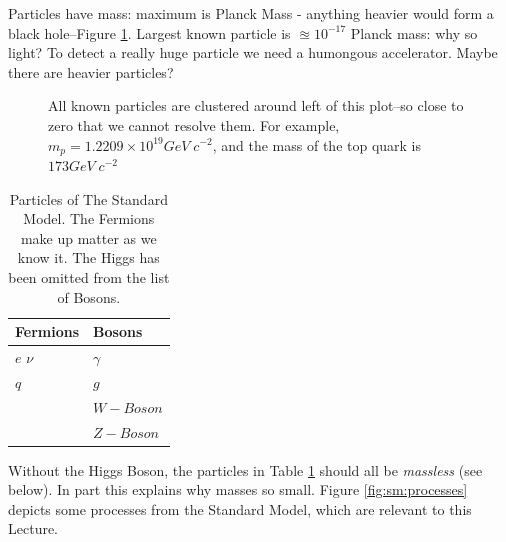 \documentclass[]{article}
\begin{document}
Particles have mass: maximum is Planck Mass - anything heavier would form a black hole--Figure \ref{fig:higgs-masses}. Largest known particle is $\approxeq 10^{-17}$ Planck mass: why so light? To detect a really huge particle we need a humongous accelerator. Maybe there are heavier particles?

\begin{figure}[H]
	\begin{center}
		\caption[All known particles are clustered around left of this plot]{All known particles are clustered around left of this plot--so close to zero that we cannot resolve them. For example,  $m_p=1.2209\times10^{19}  GeV\;c^{-2}$, and the mass of the top quark is $173 GeV\;c^{-2}$}\label{fig:higgs-masses}
	\end{center}
\end{figure}


\begin{table}[H]
	\begin{center}
		\caption[Particles of The Standard Model]{Particles of The Standard Model. The Fermions make up matter as we know it. The Higgs has been omitted from the list of Bosons.}\label{table:standard-model}
		\begin{tabular}{|l|l|} \hline
			Fermions & Bosons\\ \hline
			$e$ $\nu$&$\gamma$\\
			$q$&$g$\\
			&$W-Boson$\\
			&$Z-Boson$\\ \hline
		\end{tabular}
	\end{center}
\end{table}

Without the Higgs Boson, the particles in Table \ref{table:standard-model} should all be \emph{massless} (see below). In part this explains why masses so small. Figure \ref{fig:sm:processes} depicts some processes from the Standard Model, which are relevant to this Lecture.
\end{document}
